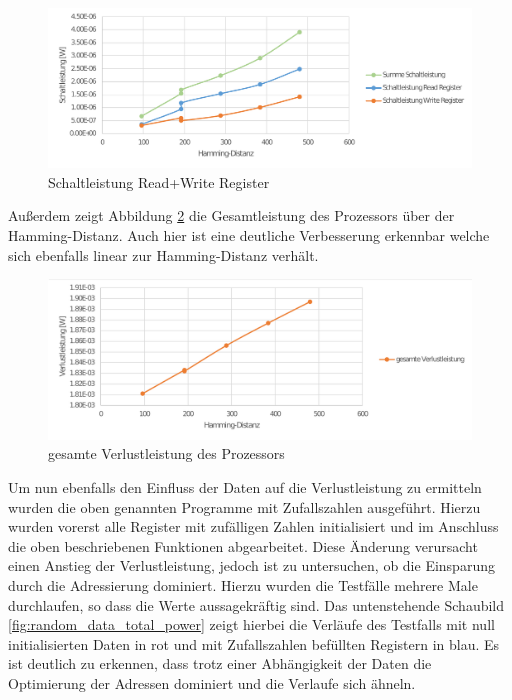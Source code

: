 \begin{figure}[H]
	\centering
	\includegraphics[width=\textwidth]{fig/source_target_power.pdf}
	\caption{Schaltleistung Read+Write Register}
	\label{fig:source_target_power}
\end{figure}

Außerdem zeigt Abbildung \ref{fig:total_power_source_target} die Gesamtleistung des Prozessors über der Hamming-Distanz. Auch hier ist eine deutliche Verbesserung erkennbar welche sich ebenfalls linear zur Hamming-Distanz verhält.

\begin{figure}[H]
	\centering
	\includegraphics[width=\textwidth]{fig/total_power_source_target.pdf}
	\caption{gesamte Verlustleistung des Prozessors}
	\label{fig:total_power_source_target}
\end{figure}


Um nun ebenfalls den Einfluss der Daten auf die Verlustleistung zu ermitteln wurden die oben genannten Programme mit Zufallszahlen ausgeführt. Hierzu wurden vorerst alle Register mit zufälligen Zahlen initialisiert und im Anschluss die oben beschriebenen Funktionen abgearbeitet. Diese Änderung verursacht einen Anstieg der Verlustleistung, jedoch ist zu untersuchen, ob die Einsparung durch die Adressierung dominiert. Hierzu wurden die Testfälle mehrere Male durchlaufen, so dass die Werte aussagekräftig sind. Das untenstehende Schaubild \ref{fig:random_data_total_power} zeigt hierbei die Verläufe des Testfalls mit null initialisierten Daten in rot und mit Zufallszahlen befüllten Registern in blau. Es ist deutlich zu erkennen, dass trotz einer Abhängigkeit der Daten die Optimierung der Adressen dominiert und die Verlaufe sich ähneln.

